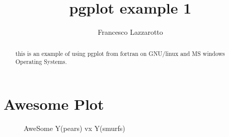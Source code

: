 \documentclass[a4paper,11pt]{article}
\title{pgplot example 1}
\author{Francesco Lazzarotto}
\begin{document}
\maketitle

\begin{abstract}
this is an example of using pgplot from fortran on GNU/linux and MS windows
Operating Systems.
\end{abstract}

\section{Awesome Plot}
\begin{figure}

\caption{AweSome Y(pears) vx Y(smurfs)}
\end{figure} 
\end{document}
